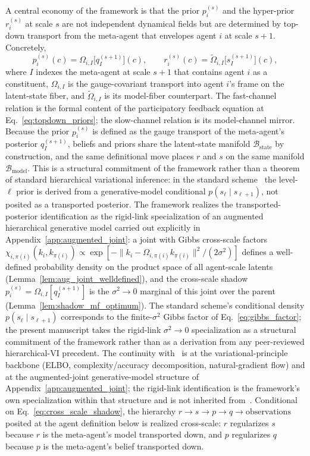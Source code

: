 \documentclass[11pt]{article}
\begin{document}
A central economy of the framework is that the prior $p_i^{(s)}$ and the hyper-prior $r_i^{(s)}$ at scale $s$ are not independent dynamical fields but are determined by top-down transport from the meta-agent that envelopes agent $i$ at scale $s+1$. Concretely,
\begin{equation}
p_i^{(s)}(c) = \Omega_{i,I}\big[q_I^{(s+1)}\big](c),
\qquad
r_i^{(s)}(c) = \tilde\Omega_{i,I}\big[s_I^{(s+1)}\big](c),
\label{eq:cross_scale_shadow}
\end{equation}
where $I$ indexes the meta-agent at scale $s+1$ that contains agent $i$ as a constituent, $\Omega_{i,I}$ is the gauge-covariant transport into agent $i$'s frame on the latent-state fiber, and $\tilde\Omega_{i,I}$ is its model-fiber counterpart. The fast-channel relation is the formal content of the participatory feedback equation at Eq.~\eqref{eq:topdown_priors}; the slow-channel relation is its model-channel mirror. Because the prior $p_i^{(s)}$ is defined as the gauge transport of the meta-agent's posterior $q_I^{(s+1)}$, beliefs and priors share the latent-state manifold $\mathcal{B}_{\mathrm{state}}$ by construction, and the same definitional move places $r$ and $s$ on the same manifold $\mathcal{B}_{\mathrm{model}}$. This is a structural commitment of the framework rather than a theorem of standard hierarchical variational inference: in the standard scheme~\cite{Friston2017, parr2022active} the level-$\ell$ prior is derived from a generative-model conditional $p(s_\ell \mid s_{\ell+1})$, not posited as a transported posterior. The framework realizes the transported-posterior identification as the rigid-link specialization of an augmented hierarchical generative model carried out explicitly in Appendix~\ref{app:augmented_joint}: a joint with Gibbs cross-scale factors $\chi_{i,\pi(i)}(k_i, k_{\pi(i)}) \propto \exp[-\|k_i - \Omega_{i,\pi(i)}k_{\pi(i)}\|^2/(2\sigma^2)]$ defines a well-defined probability density on the product space of all agent-scale latents (Lemma~\ref{lem:aug_joint_welldefined}), and the cross-scale shadow $p_i^{(s)} = \Omega_{i,I}[q_I^{(s+1)}]$ is the $\sigma^2 \to 0$ marginal of this joint over the parent (Lemma~\ref{lem:shadow_mf_optimum}). The standard scheme's conditional density $p(s_\ell \mid s_{\ell+1})$ corresponds to the finite-$\sigma^2$ Gibbs factor of Eq.~\eqref{eq:gibbs_factor}; the present manuscript takes the rigid-link $\sigma^2 \to 0$ specialization as a structural commitment of the framework rather than as a derivation from any peer-reviewed hierarchical-VI precedent. The continuity with~\cite{Friston2010, Friston2017, parr2022active} is at the variational-principle backbone (ELBO, complexity/accuracy decomposition, natural-gradient flow) and at the augmented-joint generative-model structure of Appendix~\ref{app:augmented_joint}; the rigid-link identification is the framework's own specialization within that structure and is not inherited from~\cite{Friston2017, parr2022active}. Conditional on Eq.~\eqref{eq:cross_scale_shadow}, the hierarchy $r \to s \to p \to q \to \text{observations}$ posited at the agent definition below is realized cross-scale: $r$ regularizes $s$ because $r$ is the meta-agent's model transported down, and $p$ regularizes $q$ because $p$ is the meta-agent's belief transported down.
\end{document}
